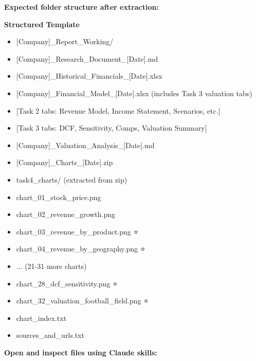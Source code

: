 \documentclass[11pt]{article}
\begin{document}
\textbf{Expected folder structure after extraction:}

\textbf{Structured Template}
\begin{itemize}[leftmargin=*,itemsep=2pt,topsep=2pt]
\item {} [Company]\_\allowbreak{}Report\_\allowbreak{}Working/
\item {} [Company]\_\allowbreak{}Research\_\allowbreak{}Document\_\allowbreak{}[Date].md
\item {} [Company]\_\allowbreak{}Historical\_\allowbreak{}Financials\_\allowbreak{}[Date].xlsx
\item {} [Company]\_\allowbreak{}Financial\_\allowbreak{}Model\_\allowbreak{}[Date].xlsx (includes Task 3 valuation tabs)
\item {} [Task 2 tabs: Revenue Model, Income Statement, Scenarios, etc.]
\item {} [Task 3 tabs: DCF, Sensitivity, Comps, Valuation Summary]
\item {} [Company]\_\allowbreak{}Valuation\_\allowbreak{}Analysis\_\allowbreak{}[Date].md
\item {} [Company]\_\allowbreak{}Charts\_\allowbreak{}[Date].zip
\item {} task4\_\allowbreak{}charts/ (extracted from zip)
\item {} chart\_\allowbreak{}01\_\allowbreak{}stock\_\allowbreak{}price.png
\item {} chart\_\allowbreak{}02\_\allowbreak{}revenue\_\allowbreak{}growth.png
\item {} chart\_\allowbreak{}03\_\allowbreak{}revenue\_\allowbreak{}by\_\allowbreak{}product.png ⭐
\item {} chart\_\allowbreak{}04\_\allowbreak{}revenue\_\allowbreak{}by\_\allowbreak{}geography.png ⭐
\item {} ... (21-31 more charts)
\item {} chart\_\allowbreak{}28\_\allowbreak{}dcf\_\allowbreak{}sensitivity.png ⭐
\item {} chart\_\allowbreak{}32\_\allowbreak{}valuation\_\allowbreak{}football\_\allowbreak{}field.png ⭐
\item {} chart\_\allowbreak{}index.txt
\item {} sources\_\allowbreak{}and\_\allowbreak{}urls.txt
\end{itemize}

\textbf{Open and inspect files using Claude skills:}
\end{document}
